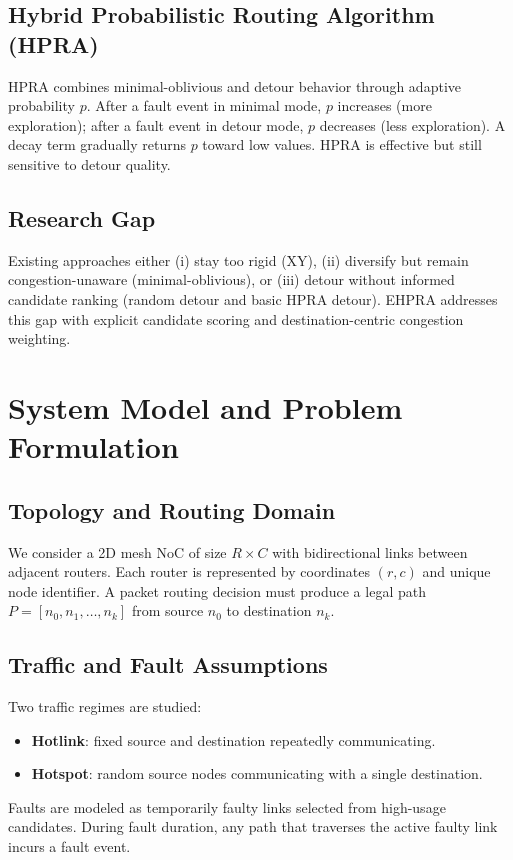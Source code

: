 \documentclass[10pt,a4paper]{article}
\begin{document}
\subsection{Hybrid Probabilistic Routing Algorithm (HPRA)}
HPRA combines minimal-oblivious and detour behavior through adaptive probability $p$. After a fault event in minimal mode, $p$ increases (more exploration); after a fault event in detour mode, $p$ decreases (less exploration). A decay term gradually returns $p$ toward low values. HPRA is effective but still sensitive to detour quality.

\subsection{Research Gap}
Existing approaches either (i) stay too rigid (XY), (ii) diversify but remain congestion-unaware (minimal-oblivious), or (iii) detour without informed candidate ranking (random detour and basic HPRA detour). EHPRA addresses this gap with explicit candidate scoring and destination-centric congestion weighting.

\section{System Model and Problem Formulation}
\subsection{Topology and Routing Domain}
We consider a 2D mesh NoC of size $R\times C$ with bidirectional links between adjacent routers. Each router is represented by coordinates $(r,c)$ and unique node identifier. A packet routing decision must produce a legal path $P = [n_0, n_1, \dots, n_k]$ from source $n_0$ to destination $n_k$.

\subsection{Traffic and Fault Assumptions}
Two traffic regimes are studied:
\begin{itemize}[leftmargin=6mm]
    \item \textbf{Hotlink}: fixed source and destination repeatedly communicating.
    \item \textbf{Hotspot}: random source nodes communicating with a single destination.
\end{itemize}
Faults are modeled as temporarily faulty links selected from high-usage candidates. During fault duration, any path that traverses the active faulty link incurs a fault event.
\end{document}
